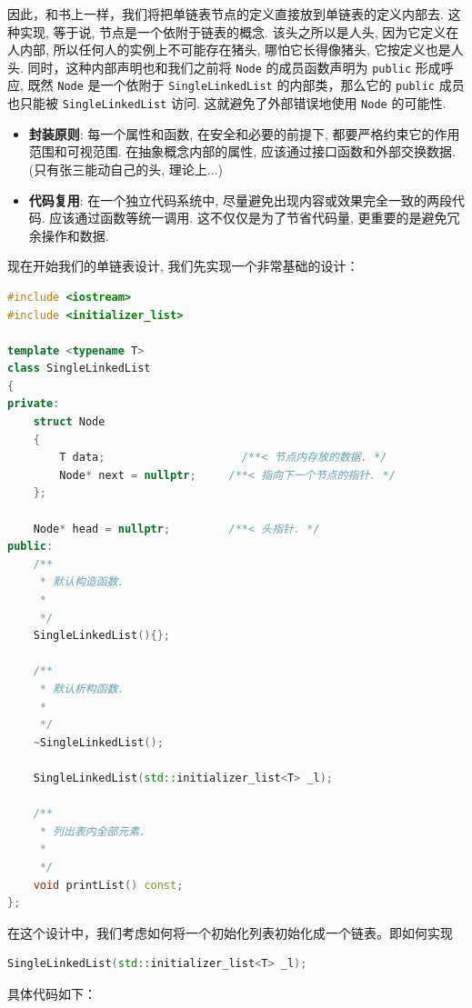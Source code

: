\documentclass[a4paper]{ctexart}
\theoremstyle{definition}
\theoremstyle{definition}
\begin{document}
因此，和书上一样，我们将把单链表节点的定义直接放到单链表的定义内部去. 这种实现, 等于说, 
节点是一个依附于链表的概念. 该头之所以是人头, 因为它定义在人内部, 
所以任何人的实例上不可能存在猪头, 哪怕它长得像猪头, 它按定义也是人头. 
同时，这种内部声明也和我们之前将 \verb|Node| 的成员函数声明为 \verb|public| 形成呼应,
既然 \verb|Node| 是一个依附于 \verb|SingleLinkedList| 的内部类，那么它的 \verb|public| 成员
也只能被 \verb|SingleLinkedList| 访问. 这就避免了外部错误地使用 \verb|Node| 的可能性.

\begin{itemize}
  \item {\bf 封装原则}: 每一个属性和函数, 在安全和必要的前提下, 都要严格约束它的作用范围和可视范围. 
  在抽象概念内部的属性, 应该通过接口函数和外部交换数据. (只有张三能动自己的头, 理论上...)
  \item {\bf 代码复用}: 在一个独立代码系统中, 尽量避免出现内容或效果完全一致的两段代码. 
  应该通过函数等统一调用. 这不仅仅是为了节省代码量, 更重要的是避免冗余操作和数据. 
\end{itemize}

现在开始我们的单链表设计, 我们先实现一个非常基础的设计：

\begin{lstlisting}[language=c++]
#include <iostream>
#include <initializer_list>
  
template <typename T>
class SingleLinkedList
{
private:
    struct Node
    {
        T data;			            /**< 节点内存放的数据. */
        Node* next = nullptr;	  /**< 指向下一个节点的指针. */
    };
  
    Node* head = nullptr;	      /**< 头指针. */
public:
    /** 
     * 默认构造函数.
     * 
     */
    SingleLinkedList(){};
  
    /** 
     * 默认析构函数.
     * 
     */
    ~SingleLinkedList();

    SingleLinkedList(std::initializer_list<T> _l);
  
    /** 
     * 列出表内全部元素.
     * 
     */
    void printList() const;
};  
\end{lstlisting}

在这个设计中，我们考虑如何将一个初始化列表初始化成一个链表。即如何实现

\begin{lstlisting}[language=c++]
SingleLinkedList(std::initializer_list<T> _l);
\end{lstlisting}

具体代码如下：
\end{document}
